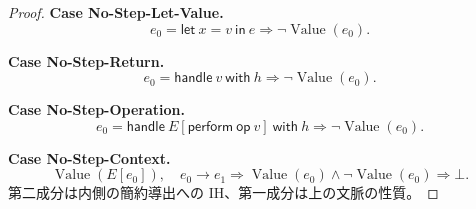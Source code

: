 \documentclass[a4paper,11pt]{article}
\theoremstyle{definition}
\newenvironment{Case}[1]{\par\smallskip\noindent\textbf{Case #1.}\enspace\ignorespaces}{\par}
\newcommand{\op}{\mathsf{op}}
\newcommand{\lete}[3]{\mathsf{let}\ #1=#2\ \mathsf{in}\ #3}
\newcommand{\perform}[2]{\mathsf{perform}\ #1\ #2}
\newcommand{\handle}[2]{\mathsf{handle}\ #1\ \mathsf{with}\ #2}
\newcommand{\Val}{\operatorname{Value}}
\begin{document}
\begin{proof}
\begin{Case}{No-Step-Let-Value}
\[e_0=\lete x v e\Longrightarrow\neg\Val(e_0).\]
\end{Case}

\begin{Case}{No-Step-Return}
\[e_0=\handle v h\Longrightarrow\neg\Val(e_0).\]
\end{Case}

\begin{Case}{No-Step-Operation}
\[e_0=\handle{E[\perform\op v]}h\Longrightarrow\neg\Val(e_0).\]
\end{Case}

\begin{Case}{No-Step-Context}
\[\Val(E[e_0]),\quad e_0\longrightarrow e_1
 \Longrightarrow\Val(e_0)\land\neg\Val(e_0)\Longrightarrow\bot.\]
第二成分は内側の簡約導出への IH、第一成分は上の文脈の性質。
\end{Case}
\end{proof}
\end{document}
